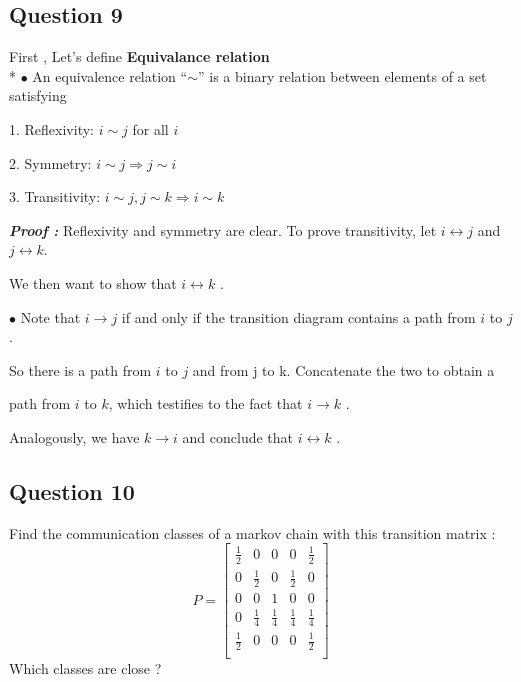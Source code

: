 \documentclass[a4paper]{article}
\begin{document}
		\subsection{{\Large Question 9}}
			First , Let's define \textbf{Equivalance relation}\\*
			$ \bullet $ An equivalence relation ``$ \sim $'' is a binary relation between elements of a set satisfying
			
			1. Reflexivity: $ i \sim j$ for all $i$
			
			2. Symmetry: $ i \sim j \Longrightarrow j \sim i$ 
			
			3. Transitivity: $ i \sim j , j \sim k \Longrightarrow i \sim k$
			
			
			\large{\bf \emph{Proof :}} Reflexivity and symmetry are clear. To prove transitivity,
			let $i \leftrightarrow j$ and $j \leftrightarrow k$.
			
			We then want to show that $i \leftrightarrow k$ .
			
			$\bullet$ Note that $i \rightarrow j$ if and only if the transition diagram contains a path from $i$ to $j$.
			
			So there is a path from $i$ to $j$ and from j to k. Concatenate the two to obtain a 
			
			path from $i$ to $k$, which testifies to the fact that $i \rightarrow k$ .
			\bigskip
			
			Analogously, we have $k \rightarrow i$ and conclude that $i \leftrightarrow k$ .
		
		\subsection{{\Large Question 10}}
		
		Find the communication classes of a markov chain with this transition matrix :	
			\begin{equation*}
				P = 
				\begin{bmatrix}
					\frac{1}{2} &0&0&0&\frac{1}{2}\\
					0&\frac{1}{2}&0&\frac{1}{2}&0\\
					0&0&1&0&0\\
					0&\frac{1}{4}&\frac{1}{4}&\frac{1}{4}&\frac{1}{4}\\
					\frac{1}{2} &0&0&0&\frac{1}{2}\\
					
				\end{bmatrix}
			\end{equation*}
			Which classes are close ?
			
\end{document}
